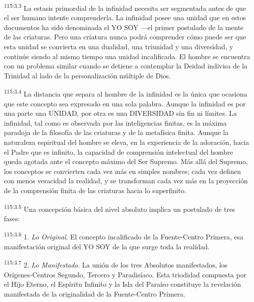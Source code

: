 \par
\textsuperscript{115:3.3} La estasis primordial de la infinidad necesita ser segmentada antes de que el ser humano intente comprenderla. La infinidad posee una unidad que en estos documentos ha sido denominada el YO SOY ---el primer postulado de la mente de las criaturas. Pero una criatura nunca podrá comprender cómo puede ser que esta unidad se convierta en una dualidad, una triunidad y una diversidad, y continúe siendo al mismo tiempo una unidad incalificada. El hombre se encuentra con un problema similar cuando se detiene a contemplar la Deidad indivisa de la Trinidad al lado de la personalización múltiple de Dios.

\par
\textsuperscript{115:3.4} La distancia que separa al hombre de la infinidad es la única que ocasiona que este concepto sea expresado en una sola palabra. Aunque la infinidad es por una parte una UNIDAD, por otra es una DIVERSIDAD sin fin ni límites. La infinidad, tal como es observada por las inteligencias finitas, es la máxima paradoja de la filosofía de las criaturas y de la metafísica finita. Aunque la naturaleza espiritual del hombre se eleva, en la experiencia de la adoración, hacia el Padre que es infinito, la capacidad de comprensión intelectual del hombre queda agotada ante el concepto máximo del Ser Supremo. Más allá del Supremo, los conceptos se convierten cada vez más en simples nombres; cada vez definen con menos veracidad la realidad, y se transforman cada vez más en la proyección de la comprensión finita de las criaturas hacia lo superfinito.

\par
\textsuperscript{115:3.5} Una concepción básica del nivel absoluto implica un postulado de tres fases:

\par
\textsuperscript{115:3.6} 1. \textit{Lo Original}. El concepto incalificado de la Fuente-Centro Primera, esa manifestación original del YO SOY de la que surge toda la realidad.

\par
\textsuperscript{115:3.7} 2. \textit{Lo Manifestado}. La unión de los tres Absolutos manifestados, los Orígenes-Centros Segundo, Tercero y Paradisíaco. Esta triodidad compuesta por el Hijo Eterno, el Espíritu Infinito y la Isla del Paraíso constituye la revelación manifestada de la originalidad de la Fuente-Centro Primera.

